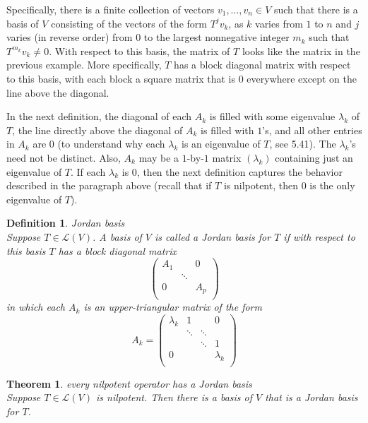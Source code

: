 \documentclass{article}
\newtheorem{theorem}{Theorem}[subsection]
\newtheorem{definition}{Definition}[subsection]
\begin{document}
\begin{CJK}{UTF8}{gkai}
Specifically, there is a finite collection of vectors $v_1,\ldots,v_n \in V$ such that there is a basis of $V$ consisting of the vectors of the form $T^j v_k$, as $k$ varies from $1$ to $n$ and $j$ varies (in reverse order) from $0$ to the largest nonnegative integer $m_k$ such that $T^{m_k}v_k \neq 0$.
With respect to this basis, the matrix of $T$ looks like the matrix in the previous example. More specifically, $T$ has a block diagonal matrix with respect to this basis, with each block a square matrix that is $0$ everywhere except on the line above the diagonal.

In the next definition, the diagonal of each $A_k$ is filled with some eigenvalue $\lambda_k$ of $T$, the line directly above the diagonal of $A_k$ is filled with $1$'s, and all other entries in $A_k$ are $0$ (to understand why each $\lambda_k$ is an eigenvalue of $T$, see 5.41).
The $\lambda_k$'s need not be distinct. Also, $A_k$ may be a $1$-by-$1$ matrix $(\lambda_k)$ containing just an eigenvalue of $T$. If each $\lambda_k$ is $0$, then the next definition captures the behavior described in the paragraph above (recall that if $T$ is nilpotent, then $0$ is the only eigenvalue of $T$).

\begin{definition}
    Jordan basis\\

    Suppose $T \in \mathcal{L}(V)$. A basis of $V$ is called a Jordan basis for $T$ if with respect to this basis $T$ has a block diagonal matrix
    \[\begin{pmatrix}
        A_1&&0\\
        &\ddots&\\
        0&&A_p\\
    \end{pmatrix}\]
    in which each $A_k$ is an upper-triangular matrix of the form
    \[A_k = \begin{pmatrix}
        \lambda_k&1&&0\\
        &\ddots&\ddots&\\
        &&\ddots&1\\
        0&&&\lambda_k\\
    \end{pmatrix}\]
\end{definition}

\begin{theorem}
    every nilpotent operator has a Jordan basis\\

    Suppose $T \in \mathcal{L}(V)$ is nilpotent. Then there is a basis of $V$ that is a Jordan basis for $T$.
\end{theorem}


\end{CJK}
\end{document}
